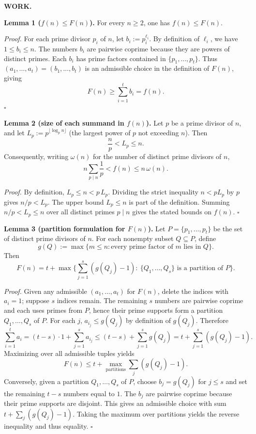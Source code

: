 \medskip
\noindent\textbf{WORK.}

\noindent\textbf{Lemma 1 ($f(n)\le F(n)$).}
For every $n\ge 2$, one has $f(n)\le F(n)$.

\noindent\emph{Proof.}
For each prime divisor $p_i$ of $n$, let $b_i:=p_i^{\ell_i}$. By definition of $\ell_i$, we have $1\le b_i\le n$.
The numbers $b_i$ are pairwise coprime because they are powers of distinct primes.
Each $b_i$ has prime factors contained in $\{p_1,\dots,p_t\}$.
Thus $(a_1,\dots,a_t)=(b_1,\dots,b_t)$ is an admissible choice in the definition of $F(n)$, giving
\[
F(n)\ge \sum_{i=1}^t b_i = f(n).
\]
\hfill$\square$

\medskip
\noindent\textbf{Lemma 2 (size of each summand in $f(n)$).}
Let $p$ be a prime divisor of $n$, and let $L_p:=p^{\lfloor\log_p n\rfloor}$ (the largest power of $p$ not exceeding $n$).
Then
\[
 \frac{n}{p} < L_p \le n.
\]
Consequently, writing $\omega(n)$ for the number of distinct prime divisors of $n$,
\[
 n\sum_{p\mid n}\frac{1}{p} < f(n)\le n\,\omega(n).
\]

\noindent\emph{Proof.}
By definition, $L_p\le n < p\,L_p$. Dividing the strict inequality $n < p L_p$ by $p$ gives $n/p < L_p$.
The upper bound $L_p\le n$ is part of the definition.
Summing $n/p < L_p\le n$ over all distinct primes $p\mid n$ gives the stated bounds on $f(n)$.
\hfill$\square$

\medskip
\noindent\textbf{Lemma 3 (partition formulation for $F(n)$).}
Let $P=\{p_1,\dots,p_t\}$ be the set of distinct prime divisors of $n$.
For each nonempty subset $Q\subseteq P$, define
\[
 g(Q):=\max\{m\le n: \text{every prime factor of }m\text{ lies in }Q\}.
\]
Then
\[
F(n)=t+\max\Big\{\sum_{j=1}^s (g(Q_j)-1):\ \{Q_1,\dots,Q_s\}\text{ is a partition of }P\Big\}.
\]

\noindent\emph{Proof.}
Given any admissible $(a_1,\dots,a_t)$ for $F(n)$, delete the indices with $a_i=1$; suppose $s$ indices remain. The remaining $s$ numbers are pairwise coprime and each uses primes from $P$, hence their prime supports form a partition $Q_1,\dots,Q_s$ of $P$.
For each $j$, $a_{i_j}\le g(Q_j)$ by definition of $g(Q_j)$. Therefore
\[
\sum_{i=1}^t a_i = (t-s)\cdot 1 + \sum_{j=1}^s a_{i_j} \le (t-s)+\sum_{j=1}^s g(Q_j)= t+\sum_{j=1}^s(g(Q_j)-1).
\]
Maximizing over all admissible tuples yields
\[
F(n)\le t+\max_{\text{partitions}}\sum_{j}(g(Q_j)-1).
\]
Conversely, given a partition $Q_1,\dots,Q_s$ of $P$, choose $b_j=g(Q_j)$ for $j\le s$ and set the remaining $t-s$ numbers equal to $1$.
The $b_j$ are pairwise coprime because their prime supports are disjoint. This gives an admissible choice with sum
$t+\sum_j(g(Q_j)-1)$.
Taking the maximum over partitions yields the reverse inequality and thus equality.
\hfill$\square$

